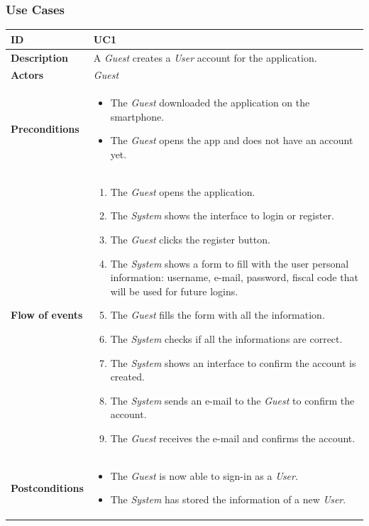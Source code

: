 \documentclass {article}
\begin{document}
	\subsubsection{Use Cases}
	
	\begin{longtable}{| p{3 cm} | p{10.5 cm} |} 
			\hline
			{\bf ID} & UC1 \\
			\hline
			{\bf Description} & A {\it Guest} creates a {\it User} account for the application.
			\\
			\hline
			{\bf Actors} & {\it Guest}\\
			\hline
			{\bf Preconditions} & 	
			\begin{itemize}
					\item The {\it Guest} downloaded the application on the smartphone.
					\item The {\it Guest} opens the app and does not have an account yet.
				\end{itemize}	
			\\
			\hline
			{\bf Flow of events} &	
			\begin{enumerate}
				\item The {\it Guest} opens the application.
				\item The {\it System} shows the interface to login or register.
				\item The {\it Guest} clicks the register button.
				\item The {\it System} shows a form to fill with the user personal information: username, e-mail, password, fiscal code that will be used for future logins.
				\item The {\it Guest} fills the form with all the information.
				\item The {\it System} checks if all the informations are correct.
				\item The {\it System} shows an interface to confirm the account is created. 
				\item The {\it System} sends an e-mail to the {\it Guest} to confirm the account.
				\item The {\it Guest} receives the e-mail and confirms the account.
			\end{enumerate}
			\\
			\hline
			{\bf Postconditions} & 
			\begin{itemize}
				\item The {\it Guest} is now able to sign-in as a {\it User}.
				\item The {\it System} has stored the information of a new {\it User}.

\end{itemize}
\end{longtable}
\end{document}
